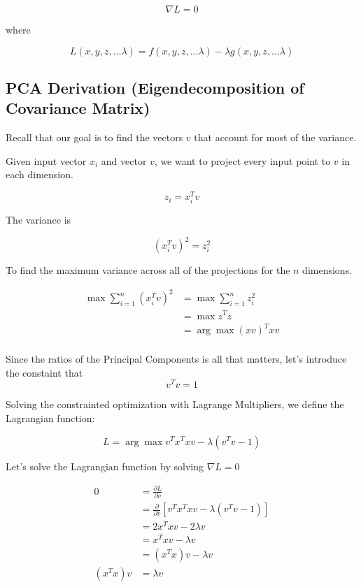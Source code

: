 \documentclass[11pt]{article}
\begin{document}
\[\nabla L = 0\]

where

\[L(x, y, z, ... \lambda) = f(x, y, z, ... \lambda) - \lambda g(x, y, z, ... \lambda)\]

    \subsection{PCA Derivation (Eigendecomposition of Covariance
Matrix)}\label{pca-derivation-eigendecomposition-of-covariance-matrix}

Recall that our goal is to find the vectors \(v\) that account for most
of the variance.

Given input vector \(x_i\) and vector \(v\), we want to project every
input point to \(v\) in each dimension.

\[z_i = x_i^Tv\]

The variance is

\[(x_i^Tv)^2 = z_i^2\]

To find the maximum variance across all of the projections for the \(n\)
dimensions.

\begin{align*}
\max \sum_{i=1}^{n} (x_i^Tv)^2 &= \max \sum_{i=1}^{n} z_i^2 \\ 
&= \max z^Tz \\ 
&= \arg\max (xv)^Txv \\ 
\end{align*}

Since the ratios of the Principal Components is all that matters, let's
introduce the constaint that \[v^Tv = 1\]

    Solving the constrainted optimization with Lagrange Multipliers, we
define the Lagrangian function:

\[ L = \arg\max v^Tx^Txv - \lambda (v^Tv - 1)\]

Let's solve the Lagrangian function by solving \(\nabla L = 0\)

\begin{align*}
0 &= \frac{\partial L}{\partial v} \\ 
&= \frac{\partial}{\partial v}[v^Tx^Txv - \lambda (v^Tv - 1)]  \\ 
&= 2x^Txv - 2\lambda v  \\
&= x^Txv - \lambda v  \\
&= (x^Tx)v - \lambda v  \\
(x^Tx)v &= \lambda v  \\
\end{align*}
\end{document}
